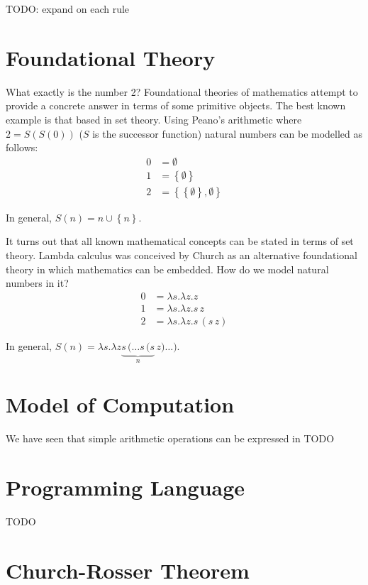 \documentclass[11pt,twoside,a4paper]{article} %
\begin{document}
TODO: expand on each rule

\section{Foundational Theory}

What exactly is the number 2? Foundational theories of mathematics attempt to 
provide a concrete answer in terms of some primitive objects. The best known 
example is that based in set theory. Using Peano's arithmetic where $2=S(S(0))$
($S$ is the successor function) natural numbers can be modelled as follows:
\begin{align*}
0 &= \emptyset \\
1 &= \left\{\emptyset\right\} \\
2 &= \left\{\left\{\emptyset\right\}, \emptyset\right\}
\end{align*}

\begin{mdframed}
In general, $S(n) = n \cup \left\{n\right\}$.
\end{mdframed}

It turns out that all known mathematical concepts can be stated in terms of 
set theory. Lambda calculus was conceived by Church as an alternative 
foundational theory in which mathematics can be embedded\cite{grue97}. 
How do we model natural numbers in it?
\begin{align*}
0 &= \lambda s.\lambda z.z \\
1 &= \lambda s.\lambda z.s\,z \\
2 &= \lambda s.\lambda z.s\,(s\,z)
\end{align*}

\begin{mdframed}
In general, $S(n) = \lambda s.\lambda z\underbrace{s\,(\dots s\,(s}_n\,z)\dots)$.
\end{mdframed}

\section{Model of Computation}

We have seen that simple arithmetic operations can be expressed in 
TODO

\section{Programming Language}

TODO

\section{Church-Rosser Theorem}
\end{document}
